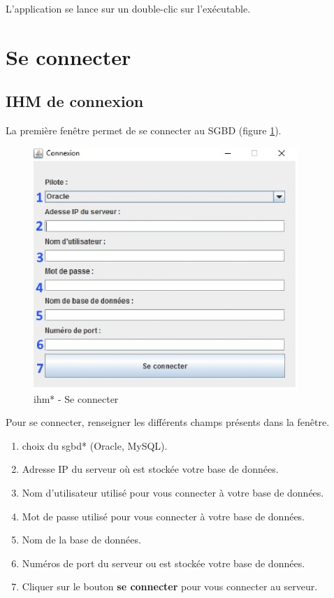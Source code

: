 L'application se lance sur un double-clic sur l'exécutable.

\section{Se connecter}
\subsection{IHM de connexion}
La première fen\^etre permet de se connecter au SGBD (figure \ref{se_connecter_gui}).
\begin{figure}[!h]
\centering
\includegraphics[width=10cm]{./images/manuel/se_connecter.eps}
\caption{\gls{ihm}* - Se connecter}
\label{se_connecter_gui}
\end{figure}

Pour se connecter, renseigner les différents champs présents dans la fen\^etre.

\begin{enumerate}
\item choix du \gls{sgbd}* (Oracle, MySQL).
\item Adresse IP du serveur où est stockée votre base de données.
\item Nom d'utilisateur utilisé pour vous connecter à votre base de données. 
\item Mot de passe utilisé pour vous connecter à votre base de données.
\item Nom de la base de données.
\item Numéros de port du serveur ou est stockée votre base de données.
\item Cliquer sur le bouton \textbf{se connecter} pour vous connecter au serveur.
\end{enumerate}

